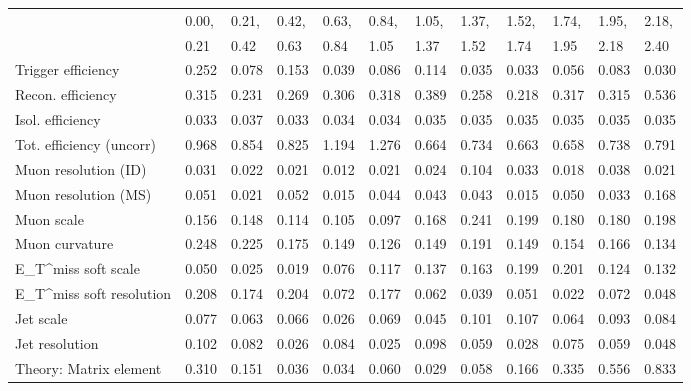 \begin{tabular}{l|p{0.6cm}p{0.6cm}p{0.6cm}p{0.6cm}p{0.6cm}p{0.6cm}p{0.6cm}p{0.6cm}p{0.6cm}p{0.6cm}p{0.6cm}}
\hline
   & 0.00, & 0.21, & 0.42, & 0.63, & 0.84, & 1.05, & 1.37, & 1.52, & 1.74, & 1.95, & 2.18,  \\ 
   & 0.21 & 0.42 & 0.63 & 0.84 & 1.05 & 1.37 & 1.52 & 1.74 & 1.95 & 2.18 & 2.40  \\ 
\hline
Trigger efficiency                       & 0.252 & 0.078 & 0.153 & 0.039 & 0.086 & 0.114 & 0.035 & 0.033 & 0.056 & 0.083 & 0.030 \\
Recon. efficiency                        & 0.315 & 0.231 & 0.269 & 0.306 & 0.318 & 0.389 & 0.258 & 0.218 & 0.317 & 0.315 & 0.536 \\
Isol. efficiency                         & 0.033 & 0.037 & 0.033 & 0.034 & 0.034 & 0.035 & 0.035 & 0.035 & 0.035 & 0.035 & 0.035 \\
Tot. efficiency (uncorr)                 & 0.968 & 0.854 & 0.825 & 1.194 & 1.276 & 0.664 & 0.734 & 0.663 & 0.658 & 0.738 & 0.791 \\
Muon resolution (ID)                     & 0.031 & 0.022 & 0.021 & 0.012 & 0.021 & 0.024 & 0.104 & 0.033 & 0.018 & 0.038 & 0.021 \\
Muon resolution (MS)                     & 0.051 & 0.021 & 0.052 & 0.015 & 0.044 & 0.043 & 0.043 & 0.015 & 0.050 & 0.033 & 0.168 \\
Muon scale                               & 0.156 & 0.148 & 0.114 & 0.105 & 0.097 & 0.168 & 0.241 & 0.199 & 0.180 & 0.180 & 0.198 \\
Muon curvature                           & 0.248 & 0.225 & 0.175 & 0.149 & 0.126 & 0.149 & 0.191 & 0.149 & 0.154 & 0.166 & 0.134 \\
E_{T}^{miss} soft scale                  & 0.050 & 0.025 & 0.019 & 0.076 & 0.117 & 0.137 & 0.163 & 0.199 & 0.201 & 0.124 & 0.132 \\
E_{T}^{miss} soft resolution             & 0.208 & 0.174 & 0.204 & 0.072 & 0.177 & 0.062 & 0.039 & 0.051 & 0.022 & 0.072 & 0.048 \\
Jet scale                                & 0.077 & 0.063 & 0.066 & 0.026 & 0.069 & 0.045 & 0.101 & 0.107 & 0.064 & 0.093 & 0.084 \\
Jet resolution                           & 0.102 & 0.082 & 0.026 & 0.084 & 0.025 & 0.098 & 0.059 & 0.028 & 0.075 & 0.059 & 0.048 \\
Theory: Matrix element                   & 0.310 & 0.151 & 0.036 & 0.034 & 0.060 & 0.029 & 0.058 & 0.166 & 0.335 & 0.556 & 0.833 \\

\end{tabular}
